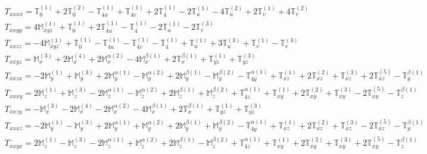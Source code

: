 \documentclass[fleqn,8pt,landscape]{jsarticle}
\begin{document}
\begin{align*}
& T_{xxxx} = \mathbb{T}_{0}^{(1)} + 2 \mathbb{T}_{0}^{(2)} - \mathbb{T}_{4u}^{(1)} + \mathbb{T}_{4v}^{(1)} + 2 \mathbb{T}_{4}^{(1)} - 2 \mathbb{T}_{u}^{(1)} - 4 \mathbb{T}_{u}^{(2)} + 2 \mathbb{T}_{v}^{(1)} + 4 \mathbb{T}_{v}^{(2)} \\
& T_{xxyy} = 4 \mathbb{M}_{xyz}^{(1)} + \mathbb{T}_{0}^{(1)} + 2 \mathbb{T}_{4u}^{(1)} - \mathbb{T}_{4}^{(1)} - 2 \mathbb{T}_{u}^{(1)} - 2 \mathbb{T}_{v}^{(3)} \\
& T_{xxzz} = - 4 \mathbb{M}_{xyz}^{(1)} + \mathbb{T}_{0}^{(1)} - \mathbb{T}_{4u}^{(1)} - \mathbb{T}_{4v}^{(1)} - \mathbb{T}_{4}^{(1)} + \mathbb{T}_{u}^{(1)} + 3 \mathbb{T}_{u}^{(3)} + \mathbb{T}_{v}^{(1)} - \mathbb{T}_{v}^{(3)} \\
& T_{xxyz} = \mathbb{M}_{x}^{(3)} + 2 \mathbb{M}_{x}^{(4)} + 2 \mathbb{M}_{x}^{\alpha(2)} - 4 \mathbb{M}_{x}^{\beta(1)} + 2 \mathbb{T}_{x}^{\beta(1)} + \mathbb{T}_{yz}^{(1)} + \mathbb{T}_{yz}^{(3)} \\
& T_{xxzx} = - 2 \mathbb{M}_{y}^{(1)} + \mathbb{M}_{y}^{(3)} + 2 \mathbb{M}_{y}^{\alpha(1)} - \mathbb{M}_{y}^{\alpha(2)} + 2 \mathbb{M}_{y}^{\beta(1)} - \mathbb{M}_{y}^{\beta(2)} - \mathbb{T}_{4y}^{\alpha(1)} + \mathbb{T}_{xz}^{(1)} + 2 \mathbb{T}_{xz}^{(2)} + \mathbb{T}_{xz}^{(3)} + 2 \mathbb{T}_{xz}^{(5)} - \mathbb{T}_{y}^{\beta(1)} \\
& T_{xxxy} = 2 \mathbb{M}_{z}^{(1)} + \mathbb{M}_{z}^{(3)} - 2 \mathbb{M}_{z}^{\alpha(1)} - \mathbb{M}_{z}^{\alpha(2)} + 2 \mathbb{M}_{z}^{\beta(1)} + \mathbb{M}_{z}^{\beta(2)} + \mathbb{T}_{4z}^{\alpha(1)} + \mathbb{T}_{xy}^{(1)} + 2 \mathbb{T}_{xy}^{(2)} + \mathbb{T}_{xy}^{(3)} - 2 \mathbb{T}_{xy}^{(5)} - \mathbb{T}_{z}^{\beta(1)} \\
& T_{xxzy} = - \mathbb{M}_{x}^{(3)} - 2 \mathbb{M}_{x}^{(4)} - 2 \mathbb{M}_{x}^{\alpha(2)} - 4 \mathbb{M}_{x}^{\beta(1)} + 2 \mathbb{T}_{x}^{\beta(1)} + \mathbb{T}_{yz}^{(1)} + \mathbb{T}_{yz}^{(3)} \\
& T_{xxxz} = - 2 \mathbb{M}_{y}^{(1)} - \mathbb{M}_{y}^{(3)} + 2 \mathbb{M}_{y}^{\alpha(1)} + \mathbb{M}_{y}^{\alpha(2)} + 2 \mathbb{M}_{y}^{\beta(1)} + \mathbb{M}_{y}^{\beta(2)} - \mathbb{T}_{4y}^{\alpha(1)} + \mathbb{T}_{xz}^{(1)} + 2 \mathbb{T}_{xz}^{(2)} + \mathbb{T}_{xz}^{(3)} - 2 \mathbb{T}_{xz}^{(5)} - \mathbb{T}_{y}^{\beta(1)} \\
& T_{xxyx} = 2 \mathbb{M}_{z}^{(1)} - \mathbb{M}_{z}^{(3)} - 2 \mathbb{M}_{z}^{\alpha(1)} + \mathbb{M}_{z}^{\alpha(2)} + 2 \mathbb{M}_{z}^{\beta(1)} - \mathbb{M}_{z}^{\beta(2)} + \mathbb{T}_{4z}^{\alpha(1)} + \mathbb{T}_{xy}^{(1)} + 2 \mathbb{T}_{xy}^{(2)} + \mathbb{T}_{xy}^{(3)} + 2 \mathbb{T}_{xy}^{(5)} - \mathbb{T}_{z}^{\beta(1)} \\

\end{align*}
\end{document}
